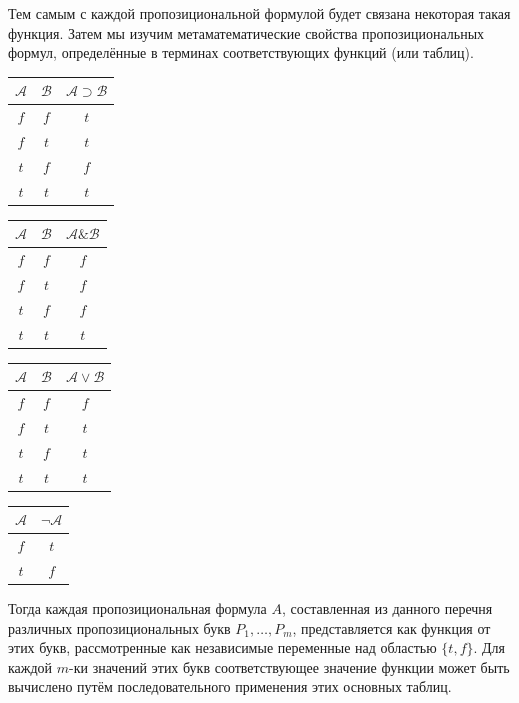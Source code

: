 \documentclass[a4paper, 12pt]{article}  %
\DeclareMathOperator{\conj}{\mathbb{\&}}
\theoremstyle{definition}
\begin{document}
	Тем самым с каждой пропозициональной формулой будет связана некоторая такая функция. Затем мы
	изучим метаматематические свойства пропозициональных формул, определённые в терминах
	соответствующих функций (или таблиц).
	
	\begin{multicols}{4}
		\begin{tabular}{ | c | c | c | }
			\hline
			$\mathscr{A}$ & $\mathscr{B}$ & $\mathscr{A} \supset \mathscr{B}$ \\ 
			\hline
			$f$ & $f$ & $t$ \\
			\hline
			$f$	& $t$ & $t$ \\
			\hline
			$t$	& $f$ & $f$\\
			\hline
			$t$ & $t$ & $t$ \\
			\hline
		\end{tabular}

		\begin{tabular}{ | c | c | c | }
			\hline
			$\mathscr{A}$ & $\mathscr{B}$ & $\mathscr{A} \conj \mathscr{B}$ \\ 
			\hline
			$f$ & $f$ & $f$ \\
			\hline
			$f$	& $t$ & $f$ \\
			\hline
			$t$	& $f$ & $f$\\
			\hline
			$t$ & $t$ & $t$ \\
			\hline
		\end{tabular}
	
		\begin{tabular}{ | c | c | c | }
			\hline
			$\mathscr{A}$ & $\mathscr{B}$ & $\mathscr{A} \vee \mathscr{B}$ \\ 
			\hline
			$f$ & $f$ & $f$ \\
			\hline
			$f$	& $t$ & $t$ \\
			\hline
			$t$	& $f$ & $t$\\
			\hline
			$t$ & $t$ & $t$ \\
			\hline
		\end{tabular}
	
		\begin{tabular}{ | c | c | }
			\hline
			$\mathscr{A}$ & $\neg \mathscr{A}$ \\ 
			\hline
			$f$ & $t$  \\
			\hline
			$t$	& $f$  \\
			\hline
		\end{tabular}
	\end{multicols}
	
	Тогда каждая пропозициональная формула $A$, составленная из данного перечня различных
	пропозициональных букв $P_1, \dots, P_m$, представляется как функция от этих букв,
	рассмотренные как независимые переменные над областью $\{t, f\}$. Для каждой $m$-ки значений
	этих букв соответствующее значение функции может быть вычислено путём последовательного
	применения этих основных таблиц.
	
\end{document}

